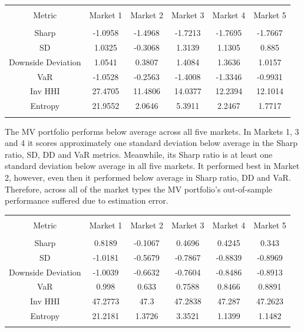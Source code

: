 \documentclass[11pt,preprint, authoryear]{elsarticle}
\let\origtable\table
\let\endorigtable\endtable
\renewenvironment{table}[1][2] {
    \expandafter\origtable\expandafter[H]
} {
    \endorigtable
}
\numberwithin{equation}{section}
\numberwithin{figure}{section}
\numberwithin{table}{section}
\begin{document}
\begin{table}[!htbp] \centering 
  \caption{Minimum Variance} 
  \label{mv} 
\begin{tabular}{@{\extracolsep{5pt}} cccccc} 
\\[-1.8ex]\hline 
\hline \\[-1.8ex] 
Metric & Market 1 & Market 2 & Market 3 & Market 4 & Market 5 \\ 
\hline \\[-1.8ex] 
Sharp & -1.0958 & -1.4968 & -1.7213 & -1.7695 & -1.7667 \\ 
SD & 1.0325 & -0.3068 & 1.3139 & 1.1305 & 0.885 \\ 
Downside Deviation & 1.0541 & 0.3807 & 1.4084 & 1.3636 & 1.0157 \\ 
VaR & -1.0528 & -0.2563 & -1.4008 & -1.3346 & -0.9931 \\ 
Inv HHI & 27.4705 & 11.4806 & 14.0377 & 12.2394 & 12.1014 \\ 
Entropy & 21.9552 & 2.0646 & 5.3911 & 2.2467 & 1.7717 \\ 
\hline \\[-1.8ex] 
\end{tabular} 
\end{table}

The MV portfolio performs below average across all five markets. In
Markets 1, 3 and 4 it scores approximately one standard deviation below
average in the Sharp ratio, SD, DD and VaR metrics. Meanwhile, its Sharp
ratio is at least one standard deviation below average in all five
markets. It performed best in Market 2, however, even then it performed
below average in Sharp ratio, DD and VaR. Therefore, across all of the
market types the MV portfolio's out-of-sample performance suffered due
to estimation error.

\begin{table}[!htbp] \centering 
  \caption{Inverse Volatility} 
  \label{iv} 
\begin{tabular}{@{\extracolsep{5pt}} cccccc} 
\\[-1.8ex]\hline 
\hline \\[-1.8ex] 
Metric & Market 1 & Market 2 & Market 3 & Market 4 & Market 5 \\ 
\hline \\[-1.8ex] 
Sharp & 0.8189 & -0.1067 & 0.4696 & 0.4245 & 0.343 \\ 
SD & -1.0181 & -0.5679 & -0.7867 & -0.8839 & -0.8969 \\ 
Downside Deviation & -1.0039 & -0.6632 & -0.7604 & -0.8486 & -0.8913 \\ 
VaR & 0.998 & 0.633 & 0.7588 & 0.8466 & 0.8891 \\ 
Inv HHI & 47.2773 & 47.3 & 47.2838 & 47.287 & 47.2623 \\ 
Entropy & 21.2181 & 1.3726 & 3.3521 & 1.1399 & 1.1482 \\ 
\hline \\[-1.8ex] 
\end{tabular} 
\end{table}
\end{document}
